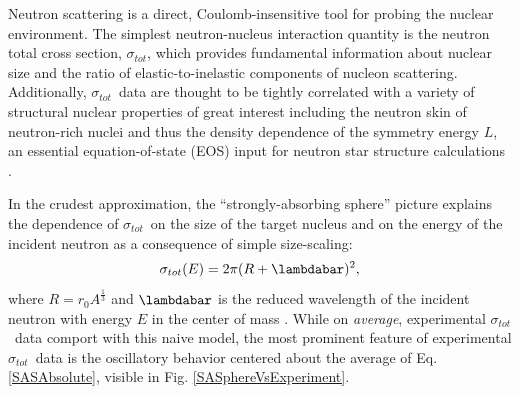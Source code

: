 \documentclass[twocolumn,secnumarabic,amssymb, nobibnotes, aps, prl,
superscriptaddress, nobalancelastpage]{revtex4}
\newcommand{\tot}{\ensuremath{\sigma_{tot}}}
\newcommand{\totRD}{\ensuremath{\sigma_{A,A'}}(E)}
\begin{document}
Neutron scattering is a direct, Coulomb-insensitive tool for probing the nuclear
environment. The simplest neutron-nucleus interaction quantity is 
the neutron total cross section, \tot, which provides fundamental information about
nuclear size and the ratio of elastic-to-inelastic components of nucleon 
scattering. Additionally, \tot\ data are thought to be tightly correlated with
a variety of structural nuclear properties of great interest
including the neutron skin of neutron-rich nuclei
\cite{Mahzoon2017} and thus the density dependence of the symmetry energy $L$,
an essential equation-of-state (EOS) input for neutron star
structure calculations \cite{Fattoyev2012, Vinas2014, Brown2000}.

In the crudest approximation, the ``strongly-absorbing sphere'' picture
explains the dependence of \tot\ on the size of the target nucleus and on the
energy of the incident neutron as a consequence of simple size-scaling:
\begin{equation} \label{SASAbsolute}
    \sigma_{tot}(E) = 2\pi(R + \lambdabar)^{2},
\end{equation}
where $R=r_{0}A^{\frac{1}{3}}$ and $\lambdabar$ is the reduced wavelength
of the incident neutron with energy $E$ in the center of mass \cite{Fernbach1949, Satchler1980}. 
While on \textit{average}, experimental \tot\ data comport with this naive
model, the most prominent feature of experimental \tot\ data is the oscillatory
behavior centered about the average of Eq. \ref{SASAbsolute}, visible in Fig.
\ref{SASphereVsExperiment}.
\end{document}
